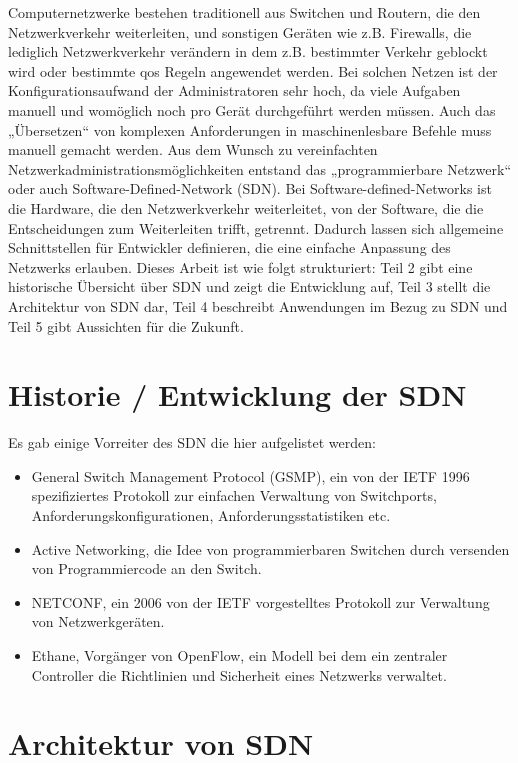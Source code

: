 \documentclass[twoside,12pt]{scrartcl}
\begin{document}
	
	Computernetzwerke bestehen traditionell aus Switchen und Routern, die den Netzwerkverkehr weiterleiten, und sonstigen Geräten wie z.B. Firewalls, die lediglich Netzwerkverkehr verändern in dem z.B. bestimmter Verkehr geblockt wird oder bestimmte qos Regeln angewendet werden. Bei solchen Netzen ist der Konfigurationsaufwand der Administratoren sehr hoch, da viele Aufgaben manuell und womöglich noch pro Gerät durchgeführt werden müssen. Auch das „Übersetzen“ von komplexen Anforderungen in maschinenlesbare Befehle muss manuell gemacht werden.
Aus dem Wunsch zu vereinfachten Netzwerkadministrationsmöglichkeiten entstand das „programmierbare Netzwerk“ oder auch Software-Defined-Network (SDN). Bei Software-defined-Networks ist die Hardware, die den Netzwerkverkehr weiterleitet, von der Software, die die Entscheidungen zum Weiterleiten trifft, getrennt. Dadurch lassen sich allgemeine Schnittstellen für Entwickler definieren, die eine einfache Anpassung des Netzwerks erlauben.
Dieses Arbeit ist wie folgt strukturiert: Teil 2 gibt eine historische Übersicht über SDN und zeigt die Entwicklung auf, Teil 3 stellt die Architektur von SDN dar, Teil 4 beschreibt Anwendungen im Bezug zu SDN und Teil 5 gibt Aussichten für die Zukunft.
	\section{Historie / Entwicklung der SDN}
	
	Es gab einige Vorreiter des SDN die hier aufgelistet werden:
	
	\begin{itemize}
		\item General Switch Management Protocol (GSMP), ein von der IETF 1996 spezifiziertes Protokoll zur einfachen Verwaltung von Switchports, Anforderungskonfigurationen, Anforderungsstatistiken etc.
		\item Active Networking, die Idee von programmierbaren Switchen durch versenden von Programmiercode an den Switch.
		\item NETCONF, ein 2006 von der IETF vorgestelltes Protokoll zur Verwaltung von Netzwerkgeräten.
		\item Ethane, Vorgänger von OpenFlow, ein Modell bei dem ein zentraler Controller die Richtlinien und Sicherheit eines Netzwerks verwaltet.
	\end{itemize}
	
	\section{Architektur von SDN}
\end{document}
